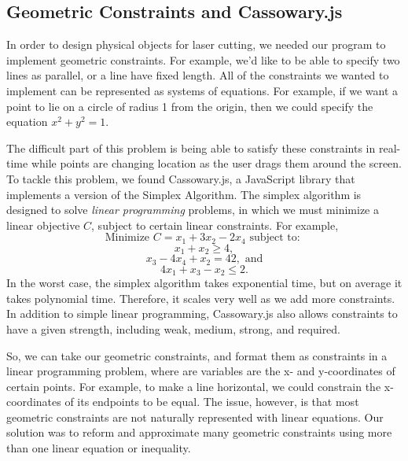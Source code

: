 \subsection*{Geometric Constraints and Cassowary.js}

In order to design physical objects for laser cutting, we needed our program to implement geometric constraints. For example, we'd like to be able to specify two lines as parallel, or a line have fixed length. All of the constraints we wanted to implement can be represented as systems of equations. For example, if we want a point to lie on a circle of radius 1 from the origin, then we could specify the equation $x^2 + y^2 = 1$. 

The difficult part of this problem is being able to satisfy these constraints in real-time while points are changing location as the user drags them around the screen. To tackle this problem, we found Cassowary.js, a JavaScript library that implements a version of the Simplex Algorithm. The simplex algorithm is designed to solve {\it linear programming} problems, in which we must minimize a linear objective $C$, subject to certain linear constraints. For example,
\[\text{Minimize } C = x_1 + 3x_2 - 2x_4 \text{ subject to: }\]
\[x_1 + x_2 \geq 4,\]
\[x_3 - 4x_4 + x_2 = 42, \text{ and}\]
\[4x_1 + x_3 - x_2 \leq 2.\]
In the worst case, the simplex algorithm takes exponential time, but on average it takes polynomial time. Therefore, it scales very well as we add more constraints. In addition to simple linear programming, Cassowary.js also allows constraints to have a given strength, including weak, medium, strong, and required.

So, we can take our geometric constraints, and format them as constraints in a linear programming problem, where are variables are the x- and y-coordinates of certain points. For example, to make a line horizontal, we could constrain the x-coordinates of its endpoints to be equal. The issue, however, is that most geometric constraints are not naturally represented with linear equations. Our solution was to reform and approximate many geometric constraints using more than one linear equation or inequality.

